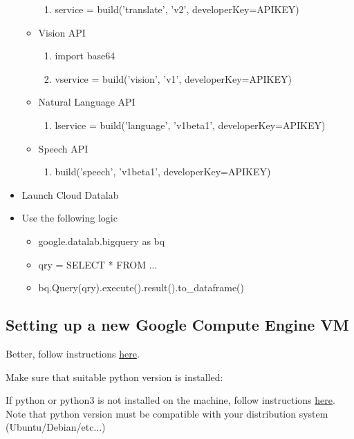 \documentclass[12pt]{article}
\begin{document}
\begin{itemize}
\begin{itemize}
\begin{enumerate}
    \item service = build('translate', 'v2', developerKey=APIKEY)
  \end{enumerate}
  \item Vision API
  \begin{enumerate}
    \item import base64
    \item vservice = build('vision', 'v1', developerKey=APIKEY)
  \end{enumerate}
  \item Natural Language API
  \begin{enumerate}
    \item lservice = build('language', 'v1beta1', developerKey=APIKEY)
  \end{enumerate}
  \item Speech API
  \begin{enumerate}
    \item build('speech', 'v1beta1', developerKey=APIKEY)
  \end{enumerate}
\end{itemize}

  \item Launch Cloud Datalab
  \item Use the following logic
  \begin{itemize}
    \item google.datalab.bigquery as bq
    \item qry = \textsc{}\textsc{}\textsc{} SELECT * FROM ...\textsc{}\textsc{}\textsc{}
    \item bq.Query(qry).execute().result().to\_dataframe()
  \end{itemize}

\end{itemize}

\subsection{Setting up a new Google Compute Engine VM}

Better, follow instructions \href{https://cloud.google.com/python/setup}{here}.

Make sure that suitable python version is installed:

If python or python3 is not installed on the machine, follow instructions \href{https://www.vultr.com/docs/upgrade-python-on-debian}{here}. Note that python version must be compatible with your distribution system (Ubuntu/Debian/etc...)
\end{document}
